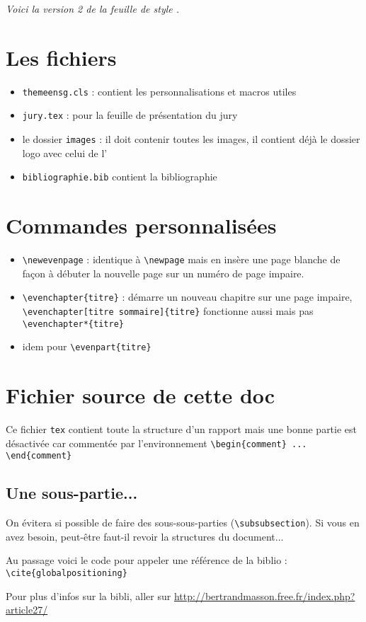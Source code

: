 
\textit{Voici la version 2 de la feuille de style \ensg. }

\section{Les fichiers}
\begin{itemize}
\item \texttt{themeensg.cls} : contient les personnalisations et macros utiles
\item \texttt{jury.tex} : pour la feuille de présentation du jury
\item le dossier \texttt{images} : il doit contenir toutes les images, il contient déjà le dossier logo avec celui de l'\ensg
\item \texttt{bibliographie.bib} contient la bibliographie
\end{itemize}

\section{Commandes personnalisées}

\begin{itemize}
\item \verb!\newevenpage! : identique à \verb!\newpage! mais en insère une page blanche de façon à débuter la nouvelle page sur un numéro de page impaire.
\item \verb!\evenchapter{titre}! : démarre un nouveau chapitre sur une page impaire,\\ \verb!\evenchapter[titre sommaire]{titre}! fonctionne aussi mais pas \verb!\evenchapter*{titre}!
\item idem pour \verb!\evenpart{titre}!
\end{itemize}

\section{Fichier source de cette doc}
Ce fichier \texttt{tex} contient toute la structure d'un rapport mais une bonne partie est désactivée car commentée par l'environnement \verb!\begin{comment} ... \end{comment}!

\subsection{Une sous-partie...}

On évitera si possible de faire des sous-sous-parties (\verb!\subsubsection!). Si vous en avez besoin, peut-être faut-il revoir la structures du document...

Au passage voici le code pour appeler une référence de la biblio \cite{globalpositioning} : \verb!\cite{globalpositioning}!

Pour plus d'infos sur la bibli, aller sur \url{http://bertrandmasson.free.fr/index.php?article27/}
